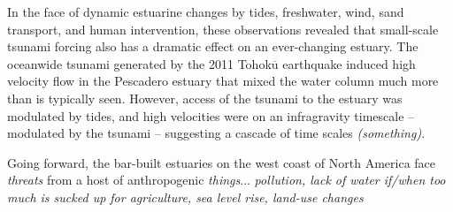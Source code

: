 In the face of dynamic estuarine changes by tides, freshwater, wind, sand transport, and human intervention, these observations revealed that small-scale tsunami forcing also has a dramatic effect on an ever-changing estuary. The oceanwide tsunami generated by the 2011 Tohok$\overline{\mathrm{u}}$ earthquake induced high velocity flow in the Pescadero estuary that mixed the water column much more than is typically seen. However, access of the tsunami to the estuary was modulated by tides, and high velocities were on an infragravity timescale -- modulated by the tsunami -- suggesting a cascade of time scales \emph{(something)}.

Going forward, the bar-built estuaries on the west coast of North America face \emph{threats} from a host of anthropogenic \emph{things}... \emph{pollution, lack of water if/when too much is sucked up for agriculture, sea level rise, land-use changes}
